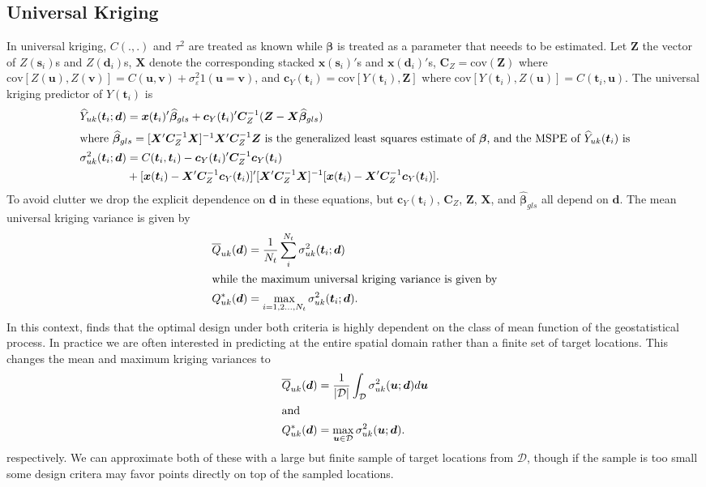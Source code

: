 \documentclass[12pt]{article}
\newcommand{\cov}{\mathrm{cov}}
\begin{document}
\subsection{Universal Kriging}
In universal kriging, $C(.,.)$ and $\tau^2$ are treated as known while $\bm{\beta}$ is treated as a parameter that neeeds to be estimated. Let $\bm{Z}$ the vector of $Z(\bm{s}_i)$s and $Z(\bm{d}_i)$s, $\bm{X}$ denote the corresponding stacked $\bm{x}(\bm{s}_i)'$s and $\bm{x}(\bm{d}_i)'$s, $\bm{C}_Z = \cov(\bm{Z})$ where $\cov[Z(\bm{u}), Z(\bm{v})] = C(\bm{u},\bm{v}) + \sigma^2_\varepsilon 1(\bm{u} = \bm{v})$, and $\bm{c}_Y(\bm{t}_i) = \cov[Y(\bm{t}_i), \bm{Z}]$ where $\cov[Y(\bm{t}_i), Z(\bm{u})] = C(\bm{t}_i, \bm{u})$. The universal kriging predictor of $Y(\bm{t}_i)$ is \citep[Section~4.1.2]{cressie2015statistics}
\begin{align*}
\widehat{Y}_{uk}(\bm{t}_i;\bm{d}) &= \bm{x}(\bm{t}_i)'\widehat{\bm{\beta}}_{gls} + \bm{c}_Y(\bm{t}_i)'\bm{C}_Z^{-1}(\bm{Z} - \bm{X}\widehat{\bm{\beta}}_{gls})\\
\intertext{where $\widehat{\bm{\beta}}_{gls} = [\bm{X}'\bm{C}_Z^{-1}\bm{X}]^{-1}\bm{X}'\bm{C}_Z^{-1}\bm{Z}$ is the generalized least squares estimate of $\bm{\beta}$, and the MSPE of $\widehat{Y}_{uk}(\bm{t}_i)$ is}
\sigma_{uk}^2(\bm{t}_i;\bm{d}) &= C(\bm{t}_i, \bm{t}_i) - \bm{c}_Y(\bm{t}_i)'\bm{C}_Z^{-1}\bm{c}_Y(\bm{t}_i)  \\
& + [\bm{x}(\bm{t}_i)  - \bm{X}'\bm{C}_Z^{-1}\bm{c}_Y(\bm{t}_i)]'[\bm{X}'\bm{C}_Z^{-1}\bm{X}]^{-1}[\bm{x}(\bm{t}_i)  - \bm{X}'\bm{C}_Z^{-1}\bm{c}_Y(\bm{t}_i)].
\end{align*}
To avoid clutter we drop the explicit dependence on $\bm{d}$ in these equations, but $\bm{c}_Y(\bm{t}_i)$, $\bm{C}_Z$, $\bm{Z}$, $\bm{X}$, and $\widehat{\bm{\beta}}_{gls}$ all depend on $\bm{d}$. The mean universal kriging variance is given by
\begin{align*}
\overline{Q}_{uk}(\bm{d}) &= \frac{1}{N_t}\sum_{i}^{N_t}\sigma^2_{uk}(\bm{t}_i;\bm{d})\\
\intertext{while the maximum universal kriging variance is given by}
Q_{uk}^*(\bm{d}) &= \max_{i=1,2\dots,N_t}\sigma^2_{uk}(\bm{t}_i;\bm{d}).
\end{align*}
In this context, \cite{zimmerman2006optimal} finds that the optimal design under both criteria is highly dependent on the class of mean function of the geostatistical process. In practice we are often interested in predicting at the entire spatial domain rather than a finite set of target locations. This changes the mean and maximum kriging variances to
\begin{align*}
\overline{Q}_{uk}(\bm{d}) &= \frac{1}{|\mathcal{D}|}\int_{\mathcal{D}}\sigma^2_{uk}(\bm{u};\bm{d})d\bm{u}\\
\intertext{and}
Q_{uk}^*(\bm{d}) &= \max_{\bm{u}\in\mathcal{D}}\sigma^2_{uk}(\bm{u};\bm{d}).
\end{align*}
respectively. We can approximate both of these with a large but finite sample of target locations from $\mathcal{D}$, though if the sample is too small some design critera may favor points directly on top of the sampled locations. 
\end{document}
